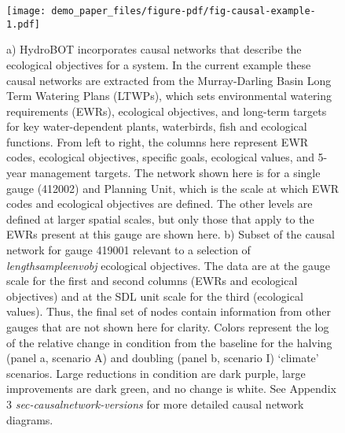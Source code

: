 \documentclass[
  number]{elsarticle}
\begin{document}
\begin{figure}

{\centering \texttt{[image: demo\_paper\_files/figure-pdf/fig-causal-example-1.pdf]}

}

\caption{\label{fig-causal-example-1}a) HydroBOT incorporates causal
networks that describe the ecological objectives for a system. In the
current example these causal networks are extracted from the
Murray-Darling Basin Long Term Watering Plans (LTWPs), which sets
environmental watering requirements (EWRs), ecological objectives, and
long-term targets for key water-dependent plants, waterbirds, fish and
ecological functions. From left to right, the columns here represent EWR
codes, ecological objectives, specific goals, ecological values, and
5-year management targets. The network shown here is for a single gauge
(412002) and Planning Unit, which is the scale at which EWR codes and
ecological objectives are defined. The other levels are defined at
larger spatial scales, but only those that apply to the EWRs present at
this gauge are shown here. b) Subset of the causal network for gauge
419001 relevant to a selection of \emph{lengthsampleenvobj} ecological
objectives. The data are at the gauge scale for the first and second
columns (EWRs and ecological objectives) and at the SDL unit scale for
the third (ecological values). Thus, the final set of nodes contain
information from other gauges that are not shown here for clarity.
Colors represent the log of the relative change in condition from the
baseline for the halving (panel a, scenario A) and doubling (panel b,
scenario I) `climate' scenarios. Large reductions in condition are dark
purple, large improvements are dark green, and no change is white. See
Appendix 3 \emph{sec-causalnetwork-versions} for more detailed causal
network diagrams.}

\end{figure}
\end{document}

